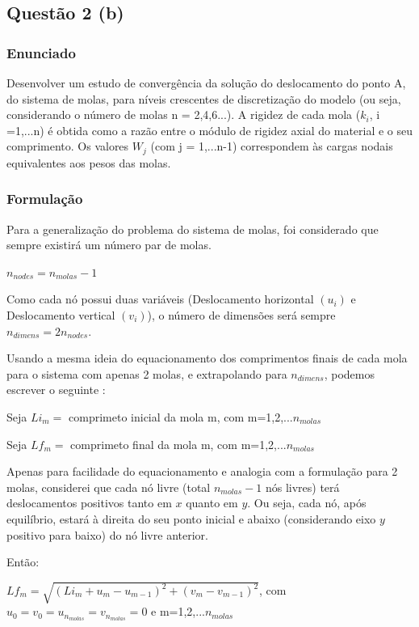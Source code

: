 \documentclass[10pt, a4paper]{article}
\begin{document}
\subsection{Questão 2 (b)}
\subsubsection{Enunciado}
Desenvolver um estudo de convergência da solução do deslocamento do ponto A, do sistema de molas, para níveis crescentes
de discretização do modelo (ou seja, considerando o número de molas n = 2,4,6...). A rigidez de cada mola ($k_i$, i =1,...n)
é obtida como a razão entre o módulo de rigidez axial do material e o seu comprimento. Os valores $W_j$ (com j = 1,...n-1)
correspondem às cargas nodais equivalentes aos pesos das molas.

\subsubsection{Formulação}

Para a generalização do problema do sistema de molas, foi considerado que sempre existirá um número par de molas.

$n_{nodes} = n_{molas} -1$

Como cada nó possui duas variáveis (Deslocamento horizontal $(u_i)$ e Deslocamento vertical $(v_i)$), o número de dimensões
será sempre $n_{dimens} = 2n_{nodes}$.

Usando a mesma ideia do equacionamento dos comprimentos finais de cada mola para o sistema com apenas 2 molas, e
extrapolando para $n_{dimens}$, podemos escrever o seguinte :

\vspace{3mm}
Seja $Li_m = $ comprimeto inicial da mola m, com m=1,2,...$n_{molas}$

\vspace{3mm}
Seja $Lf_m = $ comprimeto final da mola m, com m=1,2,...$n_{molas}$

\vspace{3mm}
Apenas para facilidade do equacionamento e analogia com a formulação para 2 molas, 
considerei que cada nó livre (total $n_{molas} - 1$ nós livres) terá deslocamentos positivos tanto em $x$ quanto em $y$. Ou seja,
cada nó, após equilíbrio, estará à direita do seu ponto inicial e abaixo (considerando eixo $y$ positivo para baixo) do nó livre anterior.

\vspace{3mm}
Então:

\vspace{3mm}
$Lf_m = \sqrt{(Li_m + u_m - u_{m-1})^2 + (v_m - v_{m-1})^2}$, com $u_0 = v_0 = u_{n_{molas}} = v_{n_{molas}} = 0 $ e m=1,2,...$n_{molas}$
\end{document}
